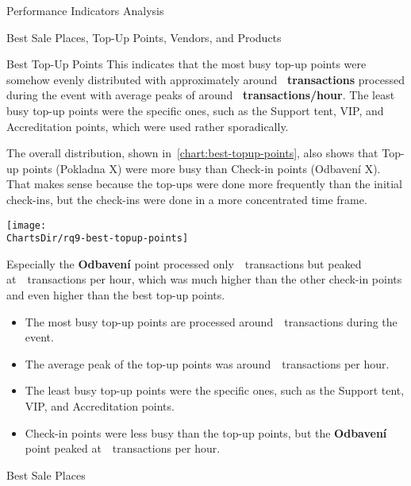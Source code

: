 \begin{section}{Performance Indicators Analysis}
\begin{subsection}{Best Sale Places, Top-Up Points, Vendors, and Products}
\begin{subsubsection}{Best Top-Up Points}
			This indicates that the most busy top-up points were somehow evenly distributed with approximately around \textbf{~transactions} processed during the event with average peaks of around \textbf{~transactions/hour}.
			The least busy top-up points were the specific ones, such as the Support tent, VIP, and Accreditation points, which were used rather sporadically.

			The overall distribution, shown in~\autoref{chart:best-topup-points}, also shows that Top-up points (Pokladna X) were more busy than Check-in points (Odbavení X).
			That makes sense because the top-ups were done more frequently than the initial check-ins, but the check-ins were done in a more concentrated time frame.

			\begin{chart}[H]
				\centering
				\texttt{[image: \\ChartsDir/rq9-best-topup-points]}
				\caption{ Best Top-Up Points}
				\label{chart:best-topup-points}
				\source
			\end{chart}

			Especially the \textbf{Odbavení} point processed only~~transactions but peaked at~~transactions per hour, which was much higher than the other check-in points and even higher than the best top-up points.

			\begin{keytakeaways}
				\begin{itemize}
					\item The most busy top-up points are processed around~~transactions during the event.
					\item The average peak of the top-up points was around~~transactions per hour.
					\item The least busy top-up points were the specific ones, such as the Support tent, VIP, and Accreditation points.
					\item Check-in points were less busy than the top-up points, but the \textbf{Odbavení} point peaked at~~transactions per hour.
				\end{itemize}
			\end{keytakeaways}

		\end{subsubsection}

		\pagebreak[4]

		\begin{subsubsection}{Best Sale Places}
			\label{subsubsec:analysis-best-sale-points}


\end{subsubsection}
\end{subsection}
\end{section}
